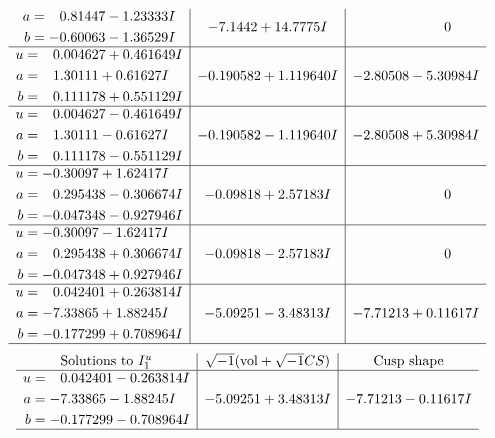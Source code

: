 \documentclass[1p]{elsarticle_modified}
\theoremstyle{definition}
\newcommand{\I}{\sqrt{-1}}
\begin{document}
$$\begin{array}{c|c|c}
\begin{aligned}
a &= \phantom{-}0.81447 - 1.23333 I \\
b &= -0.60063 - 1.36529 I\end{aligned}
 & -7.1442 + 14.7775 I & \phantom{-0.000000 } 0 \\ \hline\begin{aligned}
u &= \phantom{-}0.004627 + 0.461649 I \\
a &= \phantom{-}1.30111 + 0.61627 I \\
b &= \phantom{-}0.111178 + 0.551129 I\end{aligned}
 & -0.190582 + 1.119640 I & -2.80508 - 5.30984 I \\ \hline\begin{aligned}
u &= \phantom{-}0.004627 - 0.461649 I \\
a &= \phantom{-}1.30111 - 0.61627 I \\
b &= \phantom{-}0.111178 - 0.551129 I\end{aligned}
 & -0.190582 - 1.119640 I & -2.80508 + 5.30984 I \\ \hline\begin{aligned}
u &= -0.30097 + 1.62417 I \\
a &= \phantom{-}0.295438 - 0.306674 I \\
b &= -0.047348 - 0.927946 I\end{aligned}
 & -0.09818 + 2.57183 I & \phantom{-0.000000 } 0 \\ \hline\begin{aligned}
u &= -0.30097 - 1.62417 I \\
a &= \phantom{-}0.295438 + 0.306674 I \\
b &= -0.047348 + 0.927946 I\end{aligned}
 & -0.09818 - 2.57183 I & \phantom{-0.000000 } 0 \\ \hline\begin{aligned}
u &= \phantom{-}0.042401 + 0.263814 I \\
a &= -7.33865 + 1.88245 I \\
b &= -0.177299 + 0.708964 I\end{aligned}
 & -5.09251 - 3.48313 I & -7.71213 + 0.11617 I\\
 \hline 
 \end{array}$$\newpage$$\begin{array}{c|c|c}  
\text{Solutions to }I^u_{1}& \I (\text{vol} + \sqrt{-1}CS) & \text{Cusp shape}\\
 \hline 
\begin{aligned}
u &= \phantom{-}0.042401 - 0.263814 I \\
a &= -7.33865 - 1.88245 I \\
b &= -0.177299 - 0.708964 I\end{aligned}
 & -5.09251 + 3.48313 I & -7.71213 - 0.11617 I\\
 \hline 
 \end{array}$$\newpage\newpage\renewcommand{\arraystretch}{1}
\end{document}
